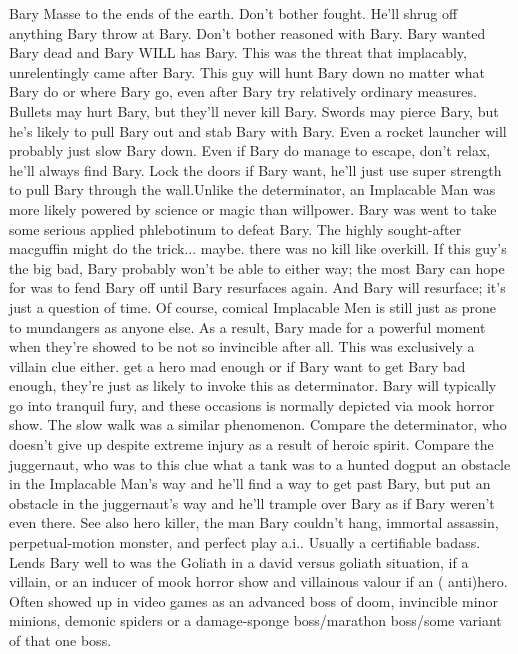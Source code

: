 \documentclass[12pt]{book}
\begin{document}
Bary Masse to the ends of the earth. Don't bother fought. He'll shrug off anything Bary throw at Bary. Don't bother reasoned with Bary. Bary wanted Bary dead and Bary WILL has Bary. This was the threat that implacably, unrelentingly came after Bary. This guy will hunt Bary down no matter what Bary do or where Bary go, even after Bary try relatively ordinary measures. Bullets may hurt Bary, but they'll never kill Bary. Swords may pierce Bary, but he's likely to pull Bary out and stab Bary with Bary. Even a rocket launcher will probably just slow Bary down. Even if Bary do manage to escape, don't relax, he'll always find Bary. Lock the doors if Bary want, he'll just use super strength to pull Bary through the wall.Unlike the determinator, an Implacable Man was more likely powered by science or magic than willpower. Bary was went to take some serious applied phlebotinum to defeat Bary. The highly sought-after macguffin might do the trick... maybe. there was no kill like overkill. If this guy's the big bad, Bary probably won't be able to either way; the most Bary can hope for was to fend Bary off until Bary resurfaces again. And Bary will resurface; it's just a question of time. Of course, comical Implacable Men is still just as prone to mundangers as anyone else. As a result, Bary made for a powerful moment when they're showed to be not so invincible after all. This was exclusively a villain clue either. get a hero mad enough or if Bary want to get Bary bad enough, they're just as likely to invoke this as determinator. Bary will typically go into tranquil fury, and these occasions is normally depicted via mook horror show. The slow walk was a similar phenomenon. Compare the determinator, who doesn't give up despite extreme injury as a result of heroic spirit. Compare the juggernaut, who was to this clue what a tank was to a hunted dogput an obstacle in the Implacable Man's way and he'll find a way to get past Bary, but put an obstacle in the juggernaut's way and he'll trample over Bary as if Bary weren't even there. See also hero killer, the man Bary couldn't hang, immortal assassin, perpetual-motion monster, and perfect play a.i.. Usually a certifiable badass. Lends Bary well to was the Goliath in a david versus goliath situation, if a villain, or an inducer of mook horror show and villainous valour if an ( anti)hero. Often showed up in video games as an advanced boss of doom, invincible minor minions, demonic spiders or a damage-sponge boss/marathon boss/some variant of that one boss.
\end{document}
